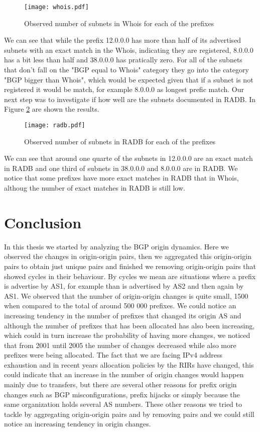 \documentclass[11pt,a4paper]{scrreprt}
\begin{document}
\begin{figure}[!h]
\centering
\texttt{[image: whois.pdf]}
\caption{Observed number of subnets in Whois for each of the prefixes}
\label{fig:whois}
\end{figure}

We can see that while the prefix 12.0.0.0 has more than half of its advertised subnets with an exact match in the Whois, indicating they are registered, 8.0.0.0 has a bit less than half and 38.0.0.0 has pratically zero. For all of the subnets that don't fall on the "BGP equal to Whois" category they go into the category "BGP bigger than Whois", which would be expected given that if a subnet is not registered it would be match, for example 8.0.0.0 as longest prefic match.
Our next step was to investigate if how well are the subnets documented in RADB. In Figure \ref{fig:radb} are shown the results.

\begin{figure}[!h]
\centering
\texttt{[image: radb.pdf]}
\caption{Observed number of subnets in RADB for each of the prefixes}
\label{fig:radb}
\end{figure}

We can see that around one quarte of the subnets in 12.0.0.0 are an exact match in RADB and one third of subnets in 38.0.0.0 and 8.0.0.0 are in RADB. We notice that some prefixes have more exact matches in RADB that in Whois, althoug the number of exact matches in RADB is still low. 

\chapter{Conclusion}

In this thesis we started by analyzing the BGP origin dynamics. Here we observed the changes in origin-origin pairs, then we aggregated this origin-origin pairs to obtain just unique pairs and finished we removing origin-origin pairs that showed cycles in their behaviour. By cycles we mean are situations where a prefix is advertise by AS1, for example than is advertised by AS2 and then again by AS1. We observed that the number of origin-origin changes is quite small, 1500 when compared to the total of around 500 000 prefixes. We could notice an increasing tendency in the number of prefixes that changed its origin AS and although the number of prefixes that has been allocated has also been increasing, which could in turn increase the probability of having more changes, we noticed that from 2001 until 2005 the number of changes decreased while also more prefixes were being allocated. The fact that we are facing IPv4 address exhaustion and in recent years allocation policies by the RIRs have changed, this could indicate that an increase in the number of origin changes would happen mainly due to transfers, but there are several other reasons for prefix origin changes such as BGP misconfigurations, prefix hijacks or simply because the same organization holds several AS numbers. These other reasons we tried to tackle by aggregating origin-origin pairs and by removing pairs and we could still notice an increasing tendency in origin changes.
\end{document}

